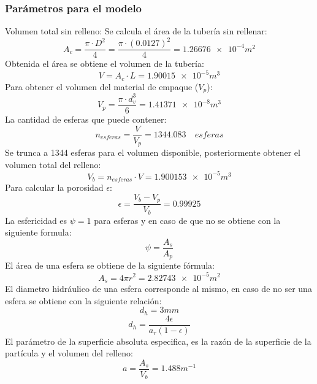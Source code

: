 \documentclass[12pt,letterpaper,final]{article}%
\begin{document}
\subsubsection*{Parámetros para el modelo}
 Volumen total sin relleno:
 Se calcula el área de la tubería sin rellenar:
 \begin{equation*}
 	A_c= \frac{\pi \cdot D^2}{4} = \frac{\pi \cdot (0.0127)^2}{4} =\num{1.26676e-4} m^2
 \end{equation*}
 Obtenida el área se obtiene el volumen de la tubería:
 \begin{equation*}
 	V=A_c \cdot L = \num{1.90015e-5} m^3
 \end{equation*}
Para obtener el volumen del material de empaque ($V_p$):
\begin{equation*}
	V_p= \frac{\pi \cdot d_v^3}{6} = \num{1.41371e-8} m^3
\end{equation*}
La cantidad de esferas que puede contener:
\begin{equation*}
	n_{esferas}= \frac{V}{V_p} = 1344.083 \quad esferas
\end{equation*}
Se trunca a 1344 esferas para el volumen disponible, posteriormente obtener el volumen total del relleno:
\begin{equation*}
	V_b= n_{esferas} \cdot V = \num{1.900153e-5} m^3
\end{equation*}
Para calcular la porosidad $\epsilon$:
\begin{equation*}
	\epsilon = \frac{V_b-V_p}{V_b} = 0.99925
\end{equation*}
La esfericidad es $\psi = 1$ para esferas y en caso de que no se obtiene con la siguiente formula:
\begin{equation}
	\psi = \frac{A_s}{A_p}
\end{equation}
El área de una esfera se obtiene de la siguiente fórmula:
\begin{equation*}
	A_s = 4 \pi r^2 = \num{2.82743e-5} m^2
\end{equation*}
El diametro hidráulico de una esfera corresponde al mismo, en caso de no ser una esfera se obtiene con la siguiente relación:
\begin{equation*}
	d_h= 3mm
\end{equation*}
\begin{equation*}
	d_h= \frac{4\epsilon}{a_r(1-\epsilon)}
\end{equation*}
El parámetro de la superficie absoluta especifica, es la razón de la superficie de la partícula y el volumen del relleno:
\begin{equation*}
	a = \frac{A_s}{V_b} = 1.488 m^{-1}
\end{equation*}
\newpage



	
	
\end{document}
